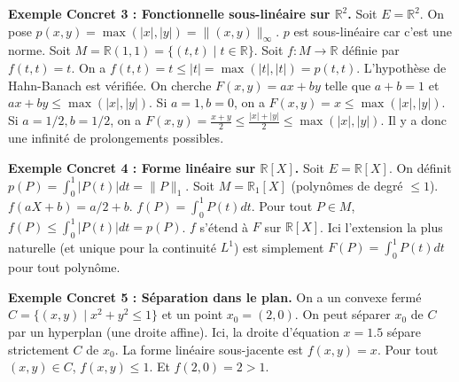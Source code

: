 \documentclass[11pt,a4paper]{article}
\begin{document}
\textbf{Exemple Concret 3 : Fonctionnelle sous-linéaire sur $\mathbb{R}^2$.}
Soit $E = \mathbb{R}^2$. On pose $p(x, y) = \max(|x|, |y|) = \|(x,y)\|_\infty$.
$p$ est sous-linéaire car c'est une norme.
Soit $M = \mathbb{R}(1, 1) = \{(t, t) \mid t \in \mathbb{R}\}$.
Soit $f : M \to \mathbb{R}$ définie par $f(t, t) = t$.
On a $f(t, t) = t \le |t| = \max(|t|, |t|) = p(t, t)$. L'hypothèse de Hahn-Banach est vérifiée.
On cherche $F(x, y) = ax + by$ telle que $a+b = 1$ et $ax+by \le \max(|x|, |y|)$.
Si $a=1, b=0$, on a $F(x, y) = x \le \max(|x|, |y|)$.
Si $a=1/2, b=1/2$, on a $F(x, y) = \frac{x+y}{2} \le \frac{|x|+|y|}{2} \le \max(|x|, |y|)$.
Il y a donc une infinité de prolongements possibles.

\textbf{Exemple Concret 4 : Forme linéaire sur $\mathbb{R}[X]$.}
Soit $E = \mathbb{R}[X]$. On définit $p(P) = \int_0^1 |P(t)| dt = \|P\|_1$.
Soit $M = \mathbb{R}_{1}[X]$ (polynômes de degré $\le 1$).
$f(aX+b) = a/2 + b$. $f(P) = \int_0^1 P(t) dt$.
Pour tout $P \in M$, $f(P) \le \int_0^1 |P(t)| dt = p(P)$.
$f$ s'étend à $F$ sur $\mathbb{R}[X]$. Ici l'extension la plus naturelle (et unique pour la continuité $L^1$) est simplement $F(P) = \int_0^1 P(t) dt$ pour tout polynôme.

\textbf{Exemple Concret 5 : Séparation dans le plan.}
On a un convexe fermé $C = \{(x, y) \mid x^2 + y^2 \le 1\}$ et un point $x_0 = (2, 0)$.
On peut séparer $x_0$ de $C$ par un hyperplan (une droite affine).
Ici, la droite d'équation $x = 1.5$ sépare strictement $C$ de $x_0$.
La forme linéaire sous-jacente est $f(x, y) = x$. Pour tout $(x, y) \in C$, $f(x,y) \le 1$. Et $f(2, 0) = 2 > 1$.


\begin{center}
\end{center}
\end{document}
